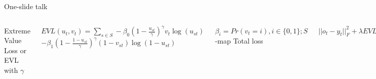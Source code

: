 \documentclass{beamer}
\begin{document}
\begin{frame}{One-slide talk}
\begin{columns}[c]
\end{columns}
\bigskip
\begin{columns}[c]
\qquad Extreme Value Loss or EVL with $\gamma$
\bigskip


 $\textit{EVL}(u_t,v_t) =\sum\limits_{s\in S} -\beta_0 \left( 1 - \frac{u_{st}}{\gamma}\right)^\gamma v_t\log(u_{st}) $  
 $ -\beta_1 \left( 1 - \frac{1 - u_{st}}{\gamma}\right)^\gamma (1-v_{st})\log(1 - u_{st}) $ 


\bigskip
\qquad $\beta_i = Pr(v_t = i ),  i \in \{0,1\}; S$ -map
Total loss

$  ||o_t - y_t||^2_F +  \lambda \textit{EVL}(u_t, v_t)$

\bigskip
$o_t$ - predicted feature map $u_t$ - predicted class map 
\qquad $\lambda$ - hyperparameter

\end{columns}
\end{frame}


\end{document}
